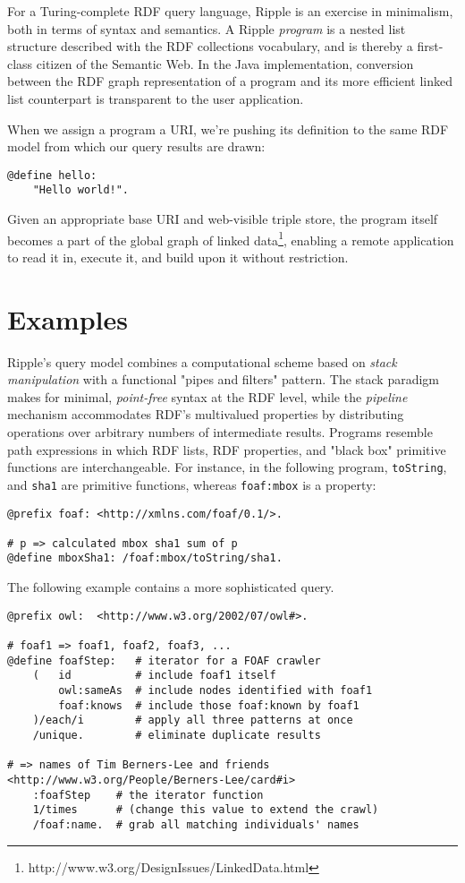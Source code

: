 \documentclass[runningheads]{llncs}
\begin{document}
For a Turing-complete RDF query language, Ripple is an exercise in minimalism, both in terms of syntax and semantics.  A Ripple \textit{program} is a nested list structure described with the RDF collections vocabulary, and is thereby a first-class citizen of the Semantic Web.  In the Java implementation, conversion between the RDF graph representation of a program and its more efficient linked list counterpart is transparent to the user application.

When we assign a program a URI, we're pushing its definition to the same RDF model from which our query results are drawn:
\begin{verbatim}
@define hello:
    "Hello world!".
\end{verbatim}
Given an appropriate base URI and web-visible triple store, the program itself becomes a part of the global graph of linked data\footnote{http://www.w3.org/DesignIssues/LinkedData.html}, enabling a remote application to read it in, execute it, and build upon it without restriction.

\section{Examples}
Ripple's query model combines a computational scheme based on \textit{stack manipulation} with a functional "pipes and filters" pattern.  The stack paradigm makes for minimal, \textit{point-free} syntax at the RDF level, while the \textit{pipeline} mechanism accommodates RDF's multivalued properties by distributing operations over arbitrary numbers of intermediate results.  Programs resemble path expressions in which RDF lists, RDF properties, and "black box" primitive functions are interchangeable.  For instance, in the following program, \texttt{toString}, and \texttt{sha1} are primitive functions, whereas \texttt{foaf:mbox} is a property:
\begin{verbatim}
@prefix foaf: <http://xmlns.com/foaf/0.1/>.

# p => calculated mbox sha1 sum of p
@define mboxSha1: /foaf:mbox/toString/sha1.
\end{verbatim}

The following example contains a more sophisticated query.
\begin{verbatim}
@prefix owl:  <http://www.w3.org/2002/07/owl#>.

# foaf1 => foaf1, foaf2, foaf3, ...
@define foafStep:   # iterator for a FOAF crawler
    (   id          # include foaf1 itself
        owl:sameAs  # include nodes identified with foaf1
        foaf:knows  # include those foaf:known by foaf1
    )/each/i        # apply all three patterns at once
    /unique.        # eliminate duplicate results

# => names of Tim Berners-Lee and friends
<http://www.w3.org/People/Berners-Lee/card#i>
    :foafStep    # the iterator function
    1/times      # (change this value to extend the crawl)
    /foaf:name.  # grab all matching individuals' names
\end{verbatim}
\end{document}
